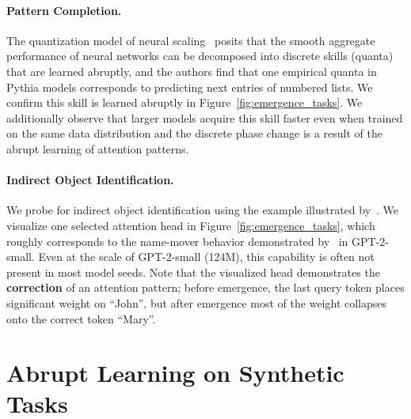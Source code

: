 \documentclass{article}
\begin{document}
\paragraph{Pattern Completion.}
The quantization model of neural scaling~\citep{michaud2024quantizationmodelneuralscaling} posits that the smooth aggregate performance of neural networks can be decomposed into discrete skills (quanta) that are learned abruptly, and the authors find that one empirical quanta in Pythia models corresponds to predicting next entries of numbered lists. We confirm this skill is learned abruptly in Figure~\ref{fig:emergence_tasks}. We additionally observe that larger models acquire this skill faster even when trained on the same data distribution and the discrete phase change is a result of the abrupt learning of attention patterns.

\paragraph{Indirect Object Identification.}
We probe for indirect object identification using the example illustrated by~\citet{wang2022interpretabilitywildcircuitindirect}. We visualize one selected attention head in Figure~\ref{fig:emergence_tasks}, which roughly corresponds to the name-mover behavior demonstrated by~\citet{wang2022interpretabilitywildcircuitindirect} in GPT-2-small. Even at the scale of GPT-2-small (124M), this capability is often not present in most model seeds. Note that the visualized head demonstrates the \textbf{correction} of an attention pattern; before emergence, the last query token places significant weight on ``John'', but after emergence most of the weight collapses onto the correct token ``Mary''.  

\section{Abrupt Learning on Synthetic Tasks}
\end{document}
